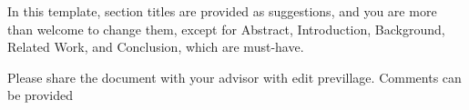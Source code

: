 In this template, section titles are provided as suggestions, and you are more than welcome to change them, except for Abstract, Introduction, Background, Related Work, and Conclusion, which are must-have. 

Please share the document with your advisor with edit previllage. Comments can be provided 